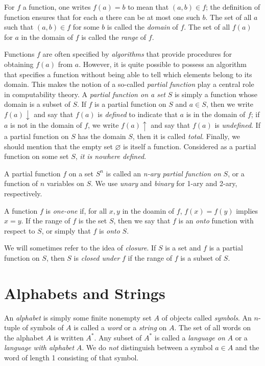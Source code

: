 \documentclass[12pt,a4paper,twoside,openany]{book}
\begin{document}
For $f$ a function, one writes $f(a)=b$ to mean that $(a,b)\in f$; the definition of function ensures that for each $a$ there can be at most one such $b$. The set of all $a$ such that $(a,b)\in f$ for some $b$ is called the \textit{domain} of $f$. The set of all $f(a)$ for $a$ in the domain of $f$ is called the \textit{range} of $f$.

Functions $f$ are often specified by \textit{algorithms} that provide procedures for obtaining $f(a)$ from $a$. However, it is quite possible to possess an algorithm that specifies a function without being able to tell which elements belong to its domain. This makes the notion of a so-called \textit{partial function} play a central role in computability theory. A \textit{partial function on a set} $S$ is simply a function whose domain is a subset of $S$. If $f$ is a partial function on $S$ and $a\in S$, then we write $f(a)\downarrow$ and say that $f(a)$ is \textit{defined} to indicate that $a$ is in the domain of $f$; if $a$ is not in the domain of $f$, we write $f(a)\uparrow$ and say that $f(a)$ is \textit{undefined}. If a partial function on $S$ has the domain $S$, then it is called \textit{total}. Finally, we should mention that the empty set $\varnothing$ is itself a function. Considered as a partial function on some set $S$, \textit{it is nowhere defined}.

A partial function $f$ on a set $S^n$ is called an \textit{n-ary partial function on} $S$, or a function of $n$ variables on $S$. We use \textit{unary} and \textit{binary} for 1-ary and 2-ary, respectively.

A function $f$ is \textit{one-one} if, for all $x,y$ in the doamin of $f$, $f(x)=f(y)$ implies $x=y$. If the range of $f$ is the set $S$, then we say that $f$ is an \textit{onto} function with respect to $S$, or simply that $f$ is \textit{onto} $S$.

We will sometimes refer to the idea of \textit{closure}. If $S$ is a set and $f$ is a partial function on $S$, then $S$ is \textit{closed under} $f$ if the range of $f$ is a subset of $S$.

\section{Alphabets and Strings}

An \textit{alphabet} is simply some finite nonempty set $A$ of objects called \textit{symbols}. An $n$-tuple of symbols of $A$ is called a \textit{word} or a \textit{string} on $A$. The set of all words on the alphabet $A$ is written $A^*$. Any subset of $A^*$ is called a \textit{language on} $A$ or a \textit{language with alphabet} $A$. We do \textit{not} distinguish between a symbol $a\in A$ and the word of length 1 consisting of that symbol.
\end{document}
